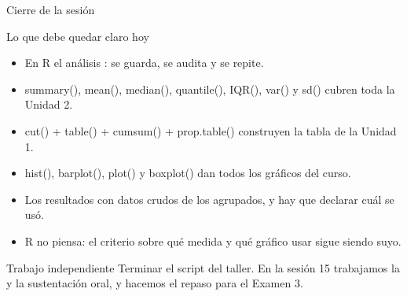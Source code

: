 \documentclass[aspectratio=169,10pt]{beamer}
\newcommand{\fx}[1]{{\ttfamily\color{uniAzul}#1}}
\begin{document}
\begin{frame}{Cierre de la sesión}
  \begin{block}{Lo que debe quedar claro hoy}
    \scriptsize
    \begin{itemize}\setlength{\itemsep}{0.02cm}
      \item En R el análisis : se guarda, se audita y se
            repite.
      \item \fx{summary()}, \fx{mean()}, \fx{median()}, \fx{quantile()},
            \fx{IQR()}, \fx{var()} y \fx{sd()} cubren toda la Unidad 2.
      \item \fx{cut()} + \fx{table()} + \fx{cumsum()} + \fx{prop.table()}
            construyen la tabla de la Unidad 1.
      \item \fx{hist()}, \fx{barplot()}, \fx{plot()} y \fx{boxplot()} dan todos
            los gráficos del curso.
      \item Los resultados con datos crudos  de los
            agrupados, y hay que declarar cuál se usó.
      \item R no piensa: el criterio sobre qué medida y qué gráfico usar sigue
            siendo suyo.
    \end{itemize}
  \end{block}

  \vspace{0.08cm}
  \begin{alertblock}{Trabajo independiente}
    \tiny
    Terminar el script del taller. En la sesión 15 trabajamos la
     y la sustentación oral,
    y hacemos el repaso para el Examen 3.
  \end{alertblock}
\end{frame}
\end{document}
